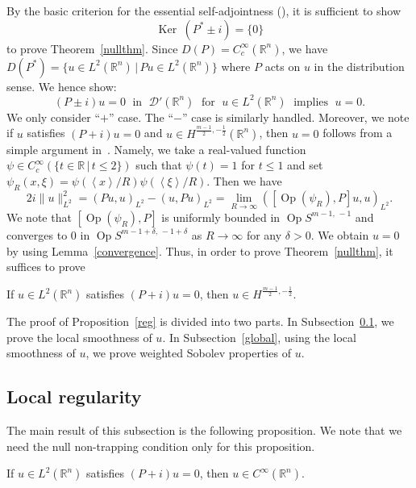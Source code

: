 \documentclass[AHL,Unicode,longabstracts,published]{cedram}
\renewcommand*\d{\delta}
\newcommand*\g{\psi}
\newcommand*\x{\xi}
\DeclareMathOperator{\Op}{Op}
\newcommand*\re{\mathbb{R}}
\newcommand{\clD}{\mathcal{D}}
\DeclareMathOperator{\Ker}{Ker\;}
\newcommand{\jap}[1]{\left\langle #1 \right\rangle}
\begin{document}
By the basic criterion for the essential self-adjointness (\cite[Theorem~VII.3]{RS}), it is sufficient to show
\[
\Ker(P^* \pm i) = \bigr\{0\bigr\}
\]
to prove Theorem~\ref{nullthm}. Since $D(P) = C_c^ \infty(\re^n)$, we have $D(P^{*})=\{u\in L^2(\re^n)\,|\, Pu\in L^2(\re^n)\}$ where $P$ acts on $u$ in the distribution sense. We hence show:
\[
(P \pm i)u = 0\; \text{ in }\;\clD'(\re^n)\; \text{ for }\;u\in L^2(\re^n)\;
\text{ implies }\;u=0.
\]
We only consider ``$+$'' case. The ``$-$'' case is similarly handled. Moreover, we note if $u$ satisfies $(P+i)u=0$ and $u\in H^{\frac{m-1}{2},-\frac{1}{2}}(\re^n)$, then $u=0$ follows from a simple argument in~\cite{Va1}. Namely, we take a real-valued function $\g\in C_c^{\infty}(\{t\in \re\,|\, t\leq 2\})$ such that $\g(t)=1$ for $t\leq1$ and set $\g_{R}(x,\x)=\g(\jap{x}/R)\g(\jap{\x}/R)$. Then we have
\[
2i\|u\|_{L^2}^2=(Pu,u)_{L^2}-(u,Pu)_{L^2}=\lim_{R\to \infty}\left(\left[\Op(\g_R),P\right]u,u\right)_{L^2}.
\]
We note that $[\Op(\g_R),P]$ is uniformly bounded in $\Op S^{m-1,\,-1}$ and converges to $0$ in $\Op S^{m-1+\d,\,-1+\d}$ as $R\to \infty$ for any $\d>0$. We obtain $u=0$ by using Lemma~\ref{convergence}. Thus, in order to prove Theorem~\ref{nullthm}, it suffices to prove

\begin{prop}\label{reg}
If $u\in L^2(\re^n)$ satisfies $(P+i)u=0$, then $u \in H^{\frac{m-1}{2},-\frac{1}{2}}$.
\end{prop}

The proof of Proposition~\ref{reg} is divided into two parts. In Subsection~\ref{local}, we prove the local smoothness of $u$. In Subsection~\ref{global}, using the local smoothness of $u$, we prove weighted Sobolev properties of $u$.

\subsection{Local regularity}\label{local}

The main result of this subsection is the following proposition. We note that we need the null non-trapping condition only for this proposition.

\begin{prop}\label{locre}
If $u\in L^2(\re^n)$ satisfies $(P+i)u=0$, then $u\in C^{\infty}(\re^n)$.
\end{prop}
\end{document}
